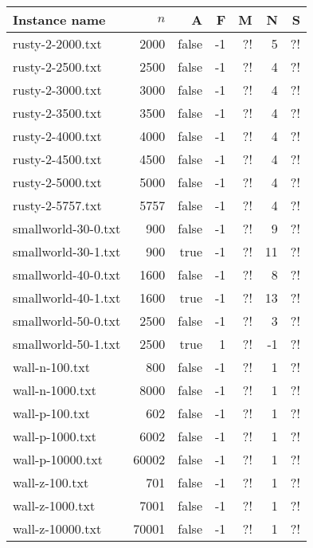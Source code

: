 \documentclass{tufte-handout}
\begin{document}
\begin{tabular}{lrrrrrr}
  \toprule
  Instance name & $n$ & A & F & M & N & S \\
  \midrule
  rusty-2-2000.txt&	2000 &	false &	-1 &	?! &	5 &	?! &	\\
  rusty-2-2500.txt&	2500 &	false &	-1 &	?! &	4 &	?! &	\\
  rusty-2-3000.txt&	3000 &	false &	-1 &	?! &	4 &	?! &	\\
  rusty-2-3500.txt&	3500 &	false &	-1 &	?! &	4 &	?! &	\\
  rusty-2-4000.txt&	4000 &	false &	-1 &	?! &	4 &	?! &	\\
  rusty-2-4500.txt&	4500 &	false &	-1 &	?! &	4 &	?! &	\\
  rusty-2-5000.txt&	5000 &	false &	-1 &	?! &	4 &	?! &	\\
  rusty-2-5757.txt&	5757 &	false &	-1 &	?! &	4 &	?! &	\\
  smallworld-30-0.txt&	900 &	false &	-1 &	?! &	9 &	?! &	\\
  smallworld-30-1.txt&	900 &	true &	-1 &	?! &	11 &	?! &	\\
  smallworld-40-0.txt&	1600 &	false &	-1 &	?! &	8 &	?! &	\\
  smallworld-40-1.txt&	1600 &	true &	-1 &	?! &	13 &	?! &	\\
  smallworld-50-0.txt&	2500 &	false &	-1 &	?! &	3 &	?! &	\\
  smallworld-50-1.txt&	2500 &	true &	1 &	?! &	-1 &	?! &	\\
  wall-n-100.txt&	800 &	false &	-1 &	?! &	1 &	?! &	\\
  wall-n-1000.txt&	8000 &	false &	-1 &	?! &	1 &	?! &	\\
  wall-p-100.txt&	602 &	false &	-1 &	?! &	1 &	?! &	\\
  wall-p-1000.txt&	6002 &	false &	-1 &	?! &	1 &	?! &	\\
  wall-p-10000.txt&	60002 &	false &	-1 &	?! &	1 &	?! &	\\
  wall-z-100.txt&	701 &	false &	-1 &	?! &	1 &	?! &	\\
  wall-z-1000.txt&	7001 &	false &	-1 &	?! &	1 &	?! &	\\
  wall-z-10000.txt&	70001 &	false &	-1 &	?! &	1 &	?! &	\\
  \bottomrule
\end{tabular}
\medskip


\end{document}
